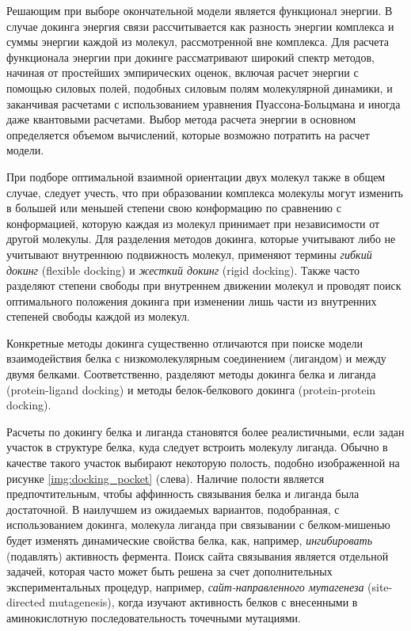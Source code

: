 Решающим при выборе окончательной модели является функционал энергии. В случае докинга энергия связи рассчитывается как разность энергии комплекса и суммы энергии каждой из молекул, рассмотренной вне комплекса. Для расчета функционала энергии при докинге рассматривают широкий спектр методов, начиная от простейших эмпирических оценок, включая расчет энергии с помощью силовых полей, подобных силовым полям молекулярной динамики, и заканчивая расчетами с использованием уравнения Пуассона-Больцмана и иногда даже квантовыми расчетами. Выбор метода расчета энергии в основном определяется объемом вычислений, которые возможно потратить на расчет модели.

При подборе оптимальной взаимной ориентации двух молекул также в общем случае, следует учесть, что при образовании комплекса молекулы могут изменить в большей или меньшей степени свою конформацию по сравнению с конформацией, которую каждая из молекул принимает при независимости от другой молекулы. Для разделения методов докинга, которые учитывают либо не учитывают внутреннюю подвижность молекул, применяют термины \textit{гибкий докинг} (flexible docking)  и \textit{жесткий докинг} (rigid docking). Также часто разделяют степени свободы при внутреннем движении молекул и проводят поиск оптимального положения докинга при изменении лишь части из внутренних степеней свободы каждой из молекул.

Конкретные методы докинга существенно отличаются при поиске модели взаимодействия белка с низкомолекулярным соединением (лигандом) и между двумя белками. Соответственно, разделяют методы докинга белка и лиганда (protein-ligand docking) и методы белок-белкового докинга (protein-protein docking).

Расчеты по докингу белка и лиганда становятся более реалистичными, если задан участок в структуре белка, куда следует встроить молекулу лиганда. Обычно в качестве такого участок выбирают некоторую полость, подобно изображенной на рисунке \ref{img:docking_pocket}  (слева). Наличие полости является предпочтительным, чтобы аффинность связывания белка и лиганда была достаточной. В наилучшем из ожидаемых вариантов, подобранная, с использованием докинга, молекула лиганда при связывании с белком-мишенью будет изменять динамические свойства белка, как, например, \textit{ингибировать} (подавлять) активность фермента. Поиск сайта связывания является отдельной задачей, которая часто может быть решена за счет дополнительных экспериментальных процедур, например, \textit{сайт-направленного мутагенеза} (site-directed mutagenesis), когда изучают активность белков с внесенными в аминокислотную последовательность точечными мутациями.

